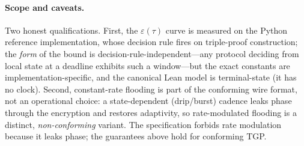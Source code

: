 \paragraph{Scope and caveats.}

Two honest qualifications. First, the $\varepsilon(\tau)$ curve is measured on the Python reference implementation, whose decision rule fires on triple-proof construction; the \emph{form} of the bound is decision-rule-independent---any protocol deciding from local state at a deadline exhibits such a window---but the exact constants are implementation-specific, and the canonical Lean model is terminal-state (it has no clock). Second, constant-rate flooding is part of the conforming wire format, not an operational choice: a state-dependent (drip/burst) cadence leaks phase through the encryption and restores adaptivity, so rate-modulated flooding is a distinct, \emph{non-conforming} variant. The specification forbids rate modulation because it leaks phase; the guarantees above hold for conforming TGP.
